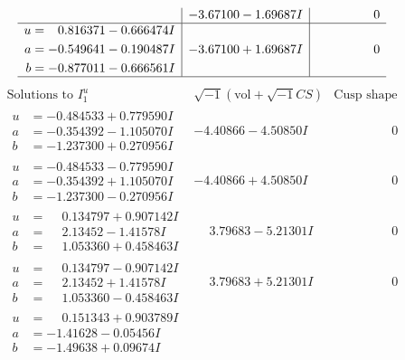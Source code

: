 \documentclass[1p]{elsarticle_modified}
\theoremstyle{definition}
\newcommand{\I}{\sqrt{-1}}
\begin{document}
$$\begin{array}{c|c|c}
 & -3.67100 - 1.69687 I & \phantom{-0.000000 } 0 \\ \hline\begin{aligned}
u &= \phantom{-}0.816371 - 0.666474 I \\
a &= -0.549641 - 0.190487 I \\
b &= -0.877011 - 0.666561 I\end{aligned}
 & -3.67100 + 1.69687 I & \phantom{-0.000000 } 0\\
 \hline 
 \end{array}$$\newpage$$\begin{array}{c|c|c}  
\text{Solutions to }I^u_{1}& \I (\text{vol} + \sqrt{-1}CS) & \text{Cusp shape}\\
 \hline 
\begin{aligned}
u &= -0.484533 + 0.779590 I \\
a &= -0.354392 - 1.105070 I \\
b &= -1.237300 + 0.270956 I\end{aligned}
 & -4.40866 - 4.50850 I & \phantom{-0.000000 } 0 \\ \hline\begin{aligned}
u &= -0.484533 - 0.779590 I \\
a &= -0.354392 + 1.105070 I \\
b &= -1.237300 - 0.270956 I\end{aligned}
 & -4.40866 + 4.50850 I & \phantom{-0.000000 } 0 \\ \hline\begin{aligned}
u &= \phantom{-}0.134797 + 0.907142 I \\
a &= \phantom{-}2.13452 - 1.41578 I \\
b &= \phantom{-}1.053360 + 0.458463 I\end{aligned}
 & \phantom{-}3.79683 - 5.21301 I & \phantom{-0.000000 } 0 \\ \hline\begin{aligned}
u &= \phantom{-}0.134797 - 0.907142 I \\
a &= \phantom{-}2.13452 + 1.41578 I \\
b &= \phantom{-}1.053360 - 0.458463 I\end{aligned}
 & \phantom{-}3.79683 + 5.21301 I & \phantom{-0.000000 } 0 \\ \hline\begin{aligned}
u &= \phantom{-}0.151343 + 0.903789 I \\
a &= -1.41628 - 0.05456 I \\
b &= -1.49638 + 0.09674 I\end{aligned}

\end{array}$$
\end{document}
